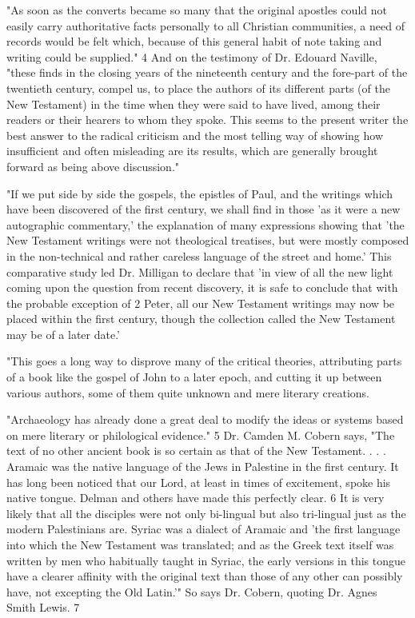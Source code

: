 "As soon as the converts became so many that the original apostles could not easily carry
authoritative facts personally to all Christian communities, a need of records would be felt
which, because of this general habit of note taking and writing could be supplied." 4 And on
the testimony of Dr. Edouard Naville, "these finds in the closing years of the nineteenth
century and the fore-part of the twentieth century, compel us, to place the authors of its
different parts (of the New Testament) in the time when they were said to have lived, among
their readers or their hearers to whom they spoke. This seems to the present writer the best
answer to the radical criticism and the most telling way of showing how insufficient and
often misleading are its results, which are generally brought forward as being above
discussion."

"If we put side by side the gospels, the epistles of Paul, and the writings which have been
discovered of the first century, we shall find in those 'as it were a new autographic
commentary,' the explanation of many expressions showing that 'the New Testament writings
were not theological treatises, but were mostly composed in the non-technical and rather
careless language of the street and home.' This comparative study led Dr. Milligan to declare
that 'in view of all the new light coming upon the question from recent discovery, it is safe to
conclude that with the probable exception of 2 Peter, all our New Testament writings may
now be placed within the first century, though the collection called the New Testament may
be of a later date.'

"This goes a long way to disprove many of the critical theories, attributing parts of a book
like the gospel of John to a later epoch, and cutting it up between various authors, some of
them quite unknown and mere literary creations.

"Archaeology has already done a great deal to modify the ideas or systems based on mere
literary or philological evidence." 5 Dr. Camden M. Cobern says, "The text of no other
ancient book is so certain as that of the New Testament. . . . Aramaic was the native language
of the Jews in Palestine in the first century. It has long been noticed that our Lord, at least in
times of excitement, spoke his native tongue. Delman and others have made this perfectly
clear. 6 It is very likely that all the disciples were not only bi-lingual but also tri-lingual just
as the modern Palestinians are. Syriac was a dialect of Aramaic and 'the first language into
which the New Testament was translated; and as the Greek text itself was written by men
who habitually taught in Syriac, the early versions in this tongue have a clearer affinity with
the original text than those of any other can possibly have, not excepting the Old Latin.'" So
says Dr. Cobern, quoting Dr. Agnes Smith Lewis. 7

